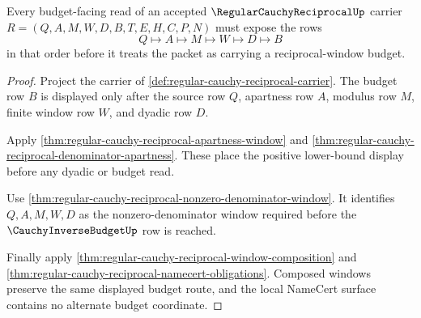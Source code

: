 \begin{theorem}
\label{thm:regular-cauchy-reciprocal-window-budget-coverage}
Every budget-facing read of an accepted $\RegularCauchyReciprocalUp$ carrier $R=(Q,A,M,W,D,B,T,E,H,C,P,N)$ must expose the rows
$$
Q\longmapsto A\longmapsto M\longmapsto W\longmapsto D\longmapsto B
$$
in that order before it treats the packet as carrying a reciprocal-window budget.
\end{theorem}
\begin{proof}
Project the carrier of \autoref{def:regular-cauchy-reciprocal-carrier}. The budget row $B$ is displayed only after the source row $Q$, apartness row $A$, modulus row $M$, finite window row $W$, and dyadic row $D$.

Apply \autoref{thm:regular-cauchy-reciprocal-apartness-window} and \autoref{thm:regular-cauchy-reciprocal-denominator-apartness}. These place the positive lower-bound display before any dyadic or budget read.

Use \autoref{thm:regular-cauchy-reciprocal-nonzero-denominator-window}. It identifies $Q,A,M,W,D$ as the nonzero-denominator window required before the $\CauchyInverseBudgetUp$ row is reached.

Finally apply \autoref{thm:regular-cauchy-reciprocal-window-composition} and \autoref{thm:regular-cauchy-reciprocal-namecert-obligations}. Composed windows preserve the same displayed budget route, and the local NameCert surface contains no alternate budget coordinate.
\end{proof}

